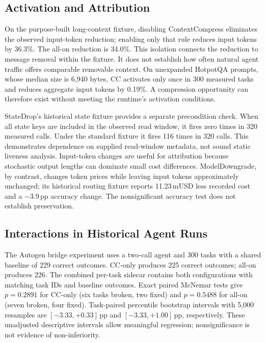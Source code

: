 \subsection{Activation and Attribution}

On the purpose-built long-context fixture, disabling ContextCompress eliminates the
observed input-token reduction; enabling only that rule reduces input tokens by
36.3\%. The all-on reduction is 34.0\%. This isolation connects the reduction to
message removal within the fixture. It does not establish how often natural agent
traffic offers comparable removable context. On unexpanded HotpotQA prompts, whose
median size is 6,940 bytes, CC activates only once in 300 measured tasks and reduces
aggregate input tokens by 0.19\%. A compression opportunity can therefore exist
without meeting the runtime's activation conditions.

StateDrop's historical state fixture provides a separate precondition check. When
all state keys are included in the observed read window, it fires zero times in
320 measured calls. Under the standard fixture it fires 116 times in 320 calls.
This demonstrates dependence on supplied read-window metadata, not sound static
liveness analysis. Input-token changes are useful for attribution because stochastic
output lengths can dominate small cost differences. ModelDowngrade, by contrast,
changes token prices while leaving input tokens approximately unchanged; its
historical routing fixture reports 11.23\,mUSD less recorded cost and a $-$3.9\,pp accuracy
change. The nonsignificant accuracy test does not establish preservation.

\subsection{Interactions in Historical Agent Runs}

The Autogen bridge experiment uses a two-call agent and 300 tasks with a shared
baseline of 229 correct outcomes. CC-only produces 225 correct outcomes; all-on
produces 226. The combined per-task sidecar contains both configurations with
matching task IDs and baseline outcomes. Exact paired McNemar tests give
$p=0.2891$ for CC-only (six tasks broken, two fixed) and $p=0.5488$ for all-on
(seven broken, four fixed). Task-paired percentile bootstrap intervals with 5,000
resamples are $[-3.33,+0.33]$\,pp and $[-3.33,+1.00]$\,pp, respectively. These
unadjusted descriptive intervals allow meaningful regression; nonsignificance is
not evidence of non-inferiority.

